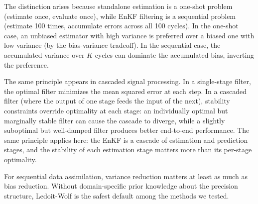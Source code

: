 The distinction arises because standalone estimation is a one-shot problem (estimate once, evaluate once), while EnKF filtering is a sequential problem (estimate 100 times, accumulate errors across all 100 cycles). In the one-shot case, an unbiased estimator with high variance is preferred over a biased one with low variance (by the bias-variance tradeoff). In the sequential case, the accumulated variance over $K$ cycles can dominate the accumulated bias, inverting the preference.

The same principle appears in cascaded signal processing. In a single-stage filter, the optimal filter minimizes the mean squared error at each step. In a cascaded filter (where the output of one stage feeds the input of the next), stability constraints override optimality at each stage: an individually optimal but marginally stable filter can cause the cascade to diverge, while a slightly suboptimal but well-damped filter produces better end-to-end performance. The same principle applies here: the EnKF is a cascade of estimation and prediction stages, and the stability of each estimation stage matters more than its per-stage optimality.

For sequential data assimilation, variance reduction matters at least as much as bias reduction. Without domain-specific prior knowledge about the precision structure, Ledoit-Wolf is the safest default among the methods we tested.

